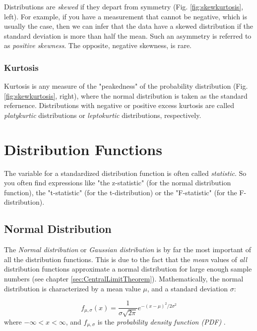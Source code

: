 Distributions are \emph{skewed} if they depart from symmetry (Fig. \ref{fig:skewkurtosis}, left). For example, if you have a measurement that cannot be negative, which is usually the case, then we can infer that the data have a skewed distribution if the standard deviation is more than half the mean. Such an asymmetry is referred to as \emph{positive skewness}. The opposite, negative skewness, is rare.

\subsubsection{Kurtosis}

Kurtosis is any measure of the "peakedness" of the probability distribution (Fig. \ref{fig:skewkurtosis}, right), where the normal distribution is taken as the standard refernence. Distributions with negative or positive excess kurtosis are called \emph{platykurtic} distributions or \emph{leptokurtic} distributions, respectively.


\section{Distribution Functions}

The variable for a standardized distribution function is often called \emph{statistic}. So you often find expressions like "the z-statistic" (for the normal distribution function), the "t-statistic" (for the t-distribution) or the "F-statistic" (for the F-distribution).

\subsection{Normal Distribution} \label{sec:normalDistribution}

The \emph{Normal distribution} or \emph{Gaussian distribution} is by far the most important of all the distribution functions. This is due to the fact that the \emph{mean }values of \emph{all} distribution functions approximate a normal distribution for large enough sample numbers (see chapter \ref{sec:CentralLimitTheorem}).
Mathematically, the normal distribution is characterized by a mean value $\mu$, and a standard deviation $\sigma$:

\begin{equation}\label{eq_normal}
     f_{\mu,\sigma} (x) = \frac{1}{\sigma \sqrt{2 \pi}} e^{-( x - \mu )^2 /2 \sigma^2}
\end{equation}
where $ - \infty < x < \infty $, and $f_{\mu,\sigma}$ is the \emph{probability density function (PDF)} .

